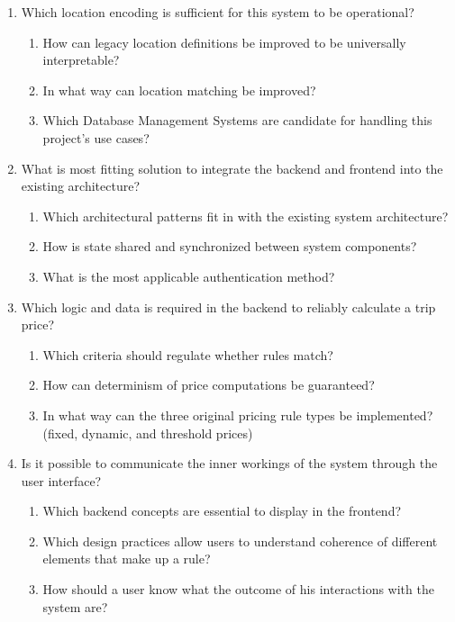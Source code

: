 \begin{enumerate}
	\item Which location encoding is sufficient for this system to be operational?
	\begin{enumerate}[label*=\arabic*.]
		\item How can legacy location definitions be improved to be universally interpretable?
		\item In what way can location matching be improved?
		\item Which Database Management Systems are candidate for handling this project's use cases?
	\end{enumerate}

	\item What is most fitting solution to integrate the backend and frontend into the existing architecture?
	\begin{enumerate}[label*=\arabic*.]
		\item Which architectural patterns fit in with the existing system architecture?
		\item How is state shared and synchronized between system components?
		\item What is the most applicable authentication method?
	\end{enumerate}

	\item Which logic and data is required in the backend to reliably calculate a trip price?
	\begin{enumerate}[label*=\arabic*.]
		\item Which criteria should regulate whether rules match?
		\item How can determinism of price computations be guaranteed?
		\item In what way can the three original pricing rule types be implemented? (fixed, dynamic, and threshold prices)
	\end{enumerate}

	\item Is it possible to communicate the inner workings of the system through the user interface?
	\begin{enumerate}[label*=\arabic*.]
		\item Which backend concepts are essential to display in the frontend?
		\item Which design practices allow users to understand coherence of different elements that make up a rule?
		\item How should a user know what the outcome of his interactions with the system are?
	\end{enumerate}

\end{enumerate}


